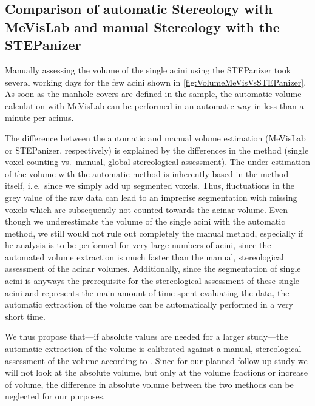 \documentclass[twoside,paper=a4,abstract=true,english,DIV=calc]{scrartcl}
\newcommand{\ie}{i.\,e.\ }
\begin{document}
\subsection[Comparison of MeVisLab with STEPanizer]{Comparison of automatic Stereology with MeVisLab and manual Stereology with the STEPanizer}
Manually assessing the volume of the single acini using the STEPanizer took several working days for the few acini shown in \autoref{fig:VolumeMeVisVsSTEPanizer}.
As soon as the manhole covers are defined in the sample, the automatic volume calculation with MeVisLab can be performed in an automatic way in less than a minute per acinus.

The difference between the automatic and manual volume estimation (MeVisLab or STEPanizer, respectively) is explained by the differences in the method (single voxel counting vs.\ manual, global stereological assessment).
The under-estimation of the volume with the automatic method is inherently based in the method itself, \ie since we simply add up segmented voxels.
Thus, fluctuations in the grey value of the raw data can lead to an imprecise segmentation with missing voxels which are subsequently not counted towards the acinar volume.
Even though we underestimate the volume of the single acini with the automatic method, we still would not rule out completely the manual method, especially if he analysis is to be performed for very large numbers of acini, since the automated volume extraction is much faster than the manual, stereological assessment of the acinar volumes.
Additionally, since the segmentation of single acini is anyways the prerequisite for the stereological assessment of these single acini and represents the main amount of time spent evaluating the data, the automatic extraction of the volume can be automatically performed in a very short time.

We thus propose that---if absolute values are needed for a larger study---the automatic extraction of the volume is calibrated against a manual, stereological assessment of the volume according to \citet{Hsia2010}.
Since for our planned follow-up study we will not look at the absolute volume, but only at the volume fractions or increase of volume, the difference in absolute volume between the two methods can be neglected for our purposes.
\end{document}
